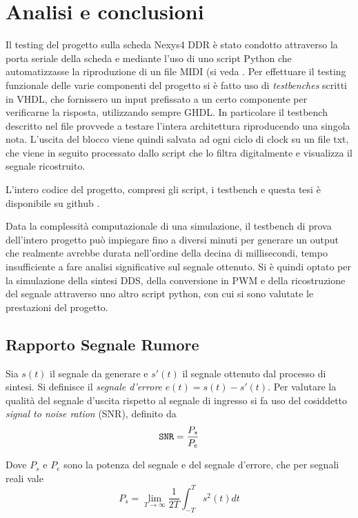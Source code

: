 \chapter{Analisi e conclusioni}
Il testing del progetto sulla scheda Nexys4 DDR è stato condotto
attraverso la porta seriale della scheda e mediante l'uso di uno
script Python che automatizzasse la riproduzione di un file MIDI 
(si veda .
Per effettuare il testing funzionale delle varie componenti del progetto
si è fatto uso di \textit{testbenches} scritti in VHDL, che fornissero
un input prefissato a un certo componente per verificarne la risposta,
utilizzando sempre GHDL.
In particolare il testbench descritto nel file
  provvede a testare l'intera
architettura riproducendo una singola nota.
L'uscita del blocco  viene quindi salvata ad ogni
ciclo di clock su un file txt, che viene in seguito processato
dallo script  che lo filtra
digitalmente e visualizza il segnale ricostruito.

L'intero codice del progetto, compresi gli script, i testbench e questa
tesi è disponibile su github \cite{sourcecode}.

Data la complessità computazionale di una simulazione, il testbench
di prova dell'intero progetto può impiegare fino a diversi minuti
per generare un output che realmente avrebbe durata nell'ordine della
decina di millisecondi, tempo insufficiente a fare analisi significative
sul segnale ottenuto.
Si è quindi optato per la simulazione della sintesi DDS, della conversione
in PWM e della ricostruzione del segnale attraverso uno altro script python,
con cui si sono valutate le prestazioni del progetto.

\section{Rapporto Segnale Rumore}
Sia $s(t)$ il segnale da generare e $s'(t)$ il segnale ottenuto
dal processo di sintesi.
Si definisce il \textit{segnale d'errore} $e(t)=s(t)-s'(t)$.
Per valutare la qualità del segnale d'uscita rispetto al segnale di ingresso
si fa uso del cosiddetto \textit{signal to noise ration} (SNR), definito da\cite{tlc}
\begin{equation}
\texttt{SNR} = \frac{P_s}{P_e}
\end{equation}

Dove $P_s$ e $P_e$ sono la potenza del segnale e del segnale d'errore, che per segnali
reali vale \cite{oppenheim}
\begin{equation}
P_s = \lim_{T\to\infty} \frac{1}{2T}\int_{-T}^{T} s^2(t) dt 
\end{equation}

